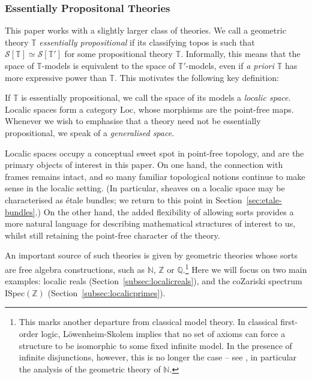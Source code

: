 \documentclass[a4paper, 11pt,reqno]{amsart}
\newcommand{\Loc}{\mathrm{Loc}}
\newcommand{\ISpec}{\mathrm{ISpec}}
\newcommand{\baseS}{\mathcal{S}}
\newcommand{\thT}{\mathbb{T}}
\newcommand{\Z}{\mathbb{Z}}
\newcommand{\N}{\mathbb{N}}
\newcommand{\Q}{\mathbb{Q}}
\begin{document}

\subsubsection{Essentially Propositonal Theories} This paper works with a slightly larger class of theories. We call a geometric theory $\thT$ {\em essentially propositional} if its classifying topos is such that $\baseS[\thT]\simeq\baseS[\thT']$ for some propositional theory $\thT$. Informally, this means that the space of $\thT$-models is equivalent to the space of $\thT'$-models, even if {\em a priori} $\thT$ has more expressive power than $\thT$. This motivates the following key definition: 


\begin{definition}\label{def:localic} If $\thT$ is essentially propositional, we call the space of its models a {\em localic space}. Localic spaces form a category $\Loc$, whose morphisms are the point-free maps. Whenever we wish to emphasise that a theory need not be essentially propositional, we speak of a {\em generalised space}.
\end{definition}


Localic spaces occupy a conceptual sweet spot in point-free topology, and are the primary objects of interest in this paper. On one hand, the connection with frames remains intact, and so many familiar topological notions continue to make sense in the localic setting. (In particular, sheaves on a localic space may be characterised as \'{e}tale bundles; we return to this point in Section~\ref{sec:etale-bundles}.) On the other hand, the added flexibility of allowing sorts provides a more natural language for describing mathematical structures of interest to us, whilst still retaining the point-free character of the theory.

An important source of such theories is given by geometric theories whose sorts are free algebra constructions, such as $\N$, $\Z$ or $\Q$.\footnote{This marks another departure from classical model theory. In classical first-order logic, L\"{o}wenheim-Skolem implies that no set of axioms can force a structure to be isomorphic to some fixed infinite model. In the presence of infinite disjunctions, however, this is no longer the case -- see \cite[\S 3.4]{Vi07}, in particular the analysis of the geometric theory of $\N$.} Here we will focus on two main examples: localic reals (Section~\ref{subsec:localicreals}), and the coZariski spectrum $\ISpec(\Z)$ (Section~\ref{subsec:localicprimes}).
\end{document}
